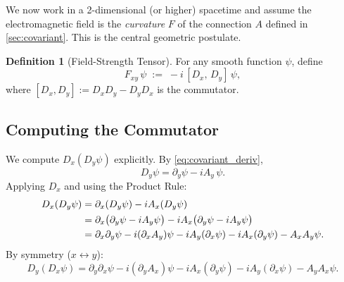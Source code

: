 \documentclass[12pt, a4paper]{article}
\theoremstyle{plain}
\theoremstyle{definition}
\newtheorem{definition}[theorem]{Definition}
\theoremstyle{remark}
\newcommand{\psifield}{\psi}
\begin{document}
We now work in a 2-dimensional (or higher) spacetime and assume the electromagnetic field is the \emph{curvature} $F$ of the connection $A$ defined in \cref{sec:covariant}.  This is the central geometric postulate.

\begin{definition}[Field-Strength Tensor]
For any smooth function $\psifield$, define
\begin{equation}
  F_{xy}\,\psifield \;:=\; -i\,[D_x,\, D_y]\,\psifield,
  \label{eq:F_def}
\end{equation}
where $[D_x,D_y] := D_x D_y - D_y D_x$ is the commutator.
\end{definition}

\subsection{Computing the Commutator}

We compute $D_x(D_y\psifield)$ explicitly.  By \eqref{eq:covariant_deriv},
\[
  D_y\psifield = \partial_y\psifield - i A_y\,\psifield.
\]
Applying $D_x$ and using the Product Rule:
\begin{align}
  D_x(D_y\psifield)
  &= \partial_x(D_y\psifield) - i A_x(D_y\psifield) \notag\\
  &= \partial_x\bigl(\partial_y\psifield - i A_y\psifield\bigr)
     - i A_x\bigl(\partial_y\psifield - i A_y\psifield\bigr) \notag\\
  &= \partial_x\partial_y\psifield
     - i(\partial_x A_y)\psifield
     - i A_y(\partial_x\psifield)
     - i A_x(\partial_y\psifield)
     - A_x A_y\psifield.
  \label{eq:DxDy}
\end{align}
By symmetry ($x \leftrightarrow y$):
\begin{equation}
  D_y(D_x\psifield)
  = \partial_y\partial_x\psifield
    - i(\partial_y A_x)\psifield
    - i A_x(\partial_y\psifield)
    - i A_y(\partial_x\psifield)
    - A_y A_x\psifield.
  \label{eq:DyDx}
\end{equation}
\end{document}

